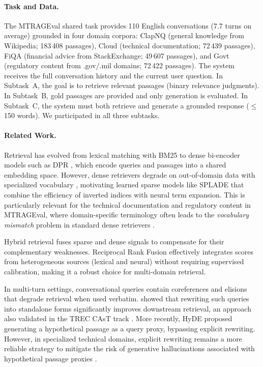 \documentclass[11pt]{article}
\begin{document}
\paragraph{Task and Data.}
The MTRAGEval shared task \cite{Rosenthal2026MTRAGEval, rosenthal2026mtragunbenchmarkopenchallenges} provides 110 English conversations (7.7 turns on average) grounded in four domain corpora: ClapNQ (general knowledge from Wikipedia; 183\,408 passages), Cloud (technical documentation; 72\,439 passages), FiQA (financial advice from StackExchange; 49\,607 passages), and Govt (regulatory content from .gov/.mil domains; 72\,422 passages). The system receives the full conversation history and the current user question. In Subtask~A, the goal is to retrieve relevant passages (binary relevance judgments). In Subtask~B, gold passages are provided and only generation is evaluated. In Subtask~C, the system must both retrieve and generate a grounded response ($\leq$150 words). We participated in all three subtasks.

\paragraph{Related Work.}
Retrieval has evolved from lexical matching with BM25 \cite{10.1561/1500000019} to dense bi-encoder models such as DPR \cite{karpukhin-etal-2020-dense}, which encode queries and passages into a shared embedding space. However, dense retrievers degrade on out-of-domain data with specialized vocabulary \cite{thakur2021beir}, motivating learned sparse models like SPLADE \cite{formal2021spladesparselexicalexpansion} that combine the efficiency of inverted indices with neural term expansion. This is particularly relevant for the technical documentation and regulatory content in MTRAGEval, where domain-specific terminology often leads to the \textit{vocabulary mismatch} problem in standard dense retrievers \citep{thakur2021beir}.

Hybrid retrieval fuses sparse and dense signals to compensate for their complementary weaknesses. Reciprocal Rank Fusion \citep{Cormack2009ReciprocalRF} effectively integrates scores from heterogeneous sources (lexical and neural) without requiring supervised calibration, making it a robust choice for multi-domain retrieval.

In multi-turn settings, conversational queries contain coreferences and elisions that degrade retrieval when used verbatim. \citet{elgohary-etal-2019-unpack} showed that rewriting such queries into standalone forms significantly improves downstream retrieval, an approach also validated in the TREC CAsT track \cite{2020arXiv200313624D}. More recently, HyDE \cite{gao-etal-2023-precise} proposed generating a hypothetical passage as a query proxy, bypassing explicit rewriting. However, in specialized technical domains, explicit rewriting remains a more reliable strategy to mitigate the risk of generative hallucinations associated with hypothetical passage proxies \cite{gao-etal-2023-precise}.
\end{document}
